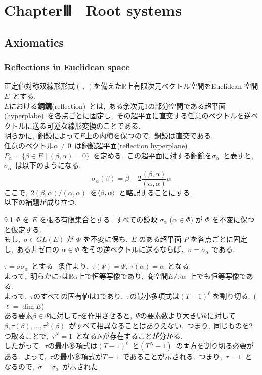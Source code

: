 \documentclass[uplatex,dvipdfmx]{jsarticle}
\begin{document}
\section{ChapterⅢ ~Root systems}
\subsection{Axiomatics}
\subsubsection{Reflections in Euclidean space}
正定値対称双線形形式$(~,~)$を備えた$\mathbb{R}$上有限次元ベクトル空間をEuclidean 空間$E$~とする.\\
$E$における\textbf{銅鏡}(reflection)~とは,~ある余次元1の部分空間である超平面(hyperplabe)~を各点ごとに固定し,~その超平面に直交する任意のベクトルを逆ベクトルに送る可逆な線形変換のことである.\\
明らかに,~銅鏡によって$E$上の内積を保つので,~銅鏡は直交である.~\\
任意のベクトル$\alpha \neq 0$~は銅鏡超平面(reflection hyperplane)~$P_\alpha = \{ \beta \in E \mid (\beta, \alpha) = 0 \}$~を定める.~この超平面に対する銅鏡を$\sigma_\alpha$~と表すと,~$\sigma_\alpha$~は以下のようになる.\\
\begin{equation*}
    \sigma_\alpha(\beta) = \beta - 2\frac{(\beta, \alpha)}{(\alpha, \alpha)}\alpha
\end{equation*}
ここで,~$2(\beta, \alpha)/(\alpha, \alpha)$~を$\ev{\beta,\alpha}$~と略記することにする.\\
以下の補題が成り立つ.
\begin{mylemma}{9.1}
    $\Phi$ を $E$ を張る有限集合とする.~すべての鏡映 $\sigma_{\alpha}$ ($\alpha \in \Phi$) が $\Phi$ を不変に保つと仮定する.\\
    もし,~$\sigma \in GL(E)$ が $\Phi$ を不変に保ち,~$E$ のある超平面 $P$ を各点ごとに固定し,~ある非ゼロの $\alpha \in \Phi$ をその逆ベクトルに送るならば、$\sigma = \sigma_{\alpha}$ である.
\end{mylemma}
\begin{myproof}
    $\tau = \sigma \sigma_\alpha$~とする.~条件より,~$\tau(\Psi) =\Psi,~\tau(\alpha) = \alpha$~となる.\\
    よって,~明らかに$\tau$は$\mathbb{R}\alpha$上で恒等写像であり,~商空間$E/\mathbb{R}\alpha$~上でも恒等写像である.\\
    よって,~$\tau$のすべての固有値は$1$であり,~$\tau$の最小多項式は$(T-1)^{\ell}$ を割り切る.~($\ell = \dim E$)\\
    ある要素$\beta \in \Psi$に対して$\tau$を作用させると,~$\Psi$の要素数より大きい$k$に対して~$\beta, \tau(\beta), \dots, \tau^k(\beta)$~がすべて相異なることはありえない.~つまり,~同じものを2つ取ることで,~$\tau^N = 1$~となる$N$が存在することが分かる.\\
    したがって,~$\tau$の最小多項式は$(T-1)^{\ell}$~と$(T^N - 1)$~の両方を割り切る必要がある.~よって,~$\tau$の最小多項式が$T-1$~であることが示される.~つまり,~$\tau = 1$~となるので,~$\sigma = \sigma_\alpha$~が示された.
\end{myproof}
\newpage
\end{document}
